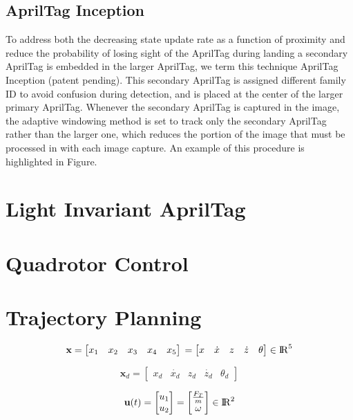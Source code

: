 \documentclass[letterpaper, 10 pt, conference]{ieeeconf}
\begin{document}
\subsection{AprilTag Inception}
To address both the decreasing state update rate as a function of proximity and
reduce the probability of losing sight of the AprilTag during landing a
secondary AprilTag is embedded in the larger AprilTag, we term this technique
AprilTag Inception (patent pending). This secondary AprilTag is assigned
different family ID to avoid confusion during detection, and is placed at the
center of the larger primary AprilTag. Whenever the secondary AprilTag is
captured in the image, the adaptive windowing method is set to track only the
secondary AprilTag rather than the larger one, which reduces the portion of the
image that must be processed in with each image capture. An example of this
procedure is highlighted in Figure.

\section{Light Invariant AprilTag}


\section{Quadrotor Control}


\section{Trajectory Planning}

\begin{equation}
  \textbf{x} = \begin{bmatrix}
      x_{1} & x_{2} & x_{3} & x_{4} & x_{5}
    \end{bmatrix} \\ 
    = \begin{bmatrix}
      x & \dot{x} & z & \dot{z} & \theta
    \end{bmatrix} \in {\rm I\!R}^{5}
\end{equation}

\begin{equation}
  \textbf{x}_{d} = \begin{bmatrix}
      x_{d} & \dot{x_{d}} & z_{d} & \dot{z_{d}} & \theta_{d}
  \end{bmatrix}
\end{equation}

\begin{equation}
  \textbf{u}(t)
    = \begin{bmatrix} u_{1} \\ u_{2} \end{bmatrix}
    = \begin{bmatrix} \frac{F_{T}}{m} \\ \omega \end{bmatrix}
    \in {\rm I\!R}^{2}
\end{equation}
\end{document}
